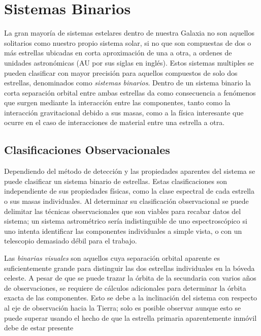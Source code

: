 \section{Sistemas Binarios}

La gran mayoría de sistemas estelares dentro de nuestra Galaxia no son aquellos
solitarios como nuestro propio sistema solar, si no que son compuestas de dos o
más estrellas ubicadas en corta aproximación de una a otra, a ordenes de
unidades astronómicas (AU por sus siglas en inglés). Estos sistemas multiples se
pueden clasificar con mayor precisión para aquellos compuestos de solo dos
estrellas, denominados como \textit{sistemas binarios}. Dentro de un sistema
binario la corta separación orbital entre ambas estrellas da como consecuencia a
fenómenos que surgen mediante la interacción entre las componentes, tanto como
la interacción gravitacional debido a sus masas, como a la física interesante
que ocurre en el caso de interacciones de material entre una estrella a otra. 

\subsection{Clasificaciones Observacionales}

Dependiendo del método de detección y las propiedades aparentes del sistema se
puede clasificar un sistema binario de estrellas. Estas clasificaciones son
independiente de sus propiedades físicas, como la clase espectral de cada
estrella o sus masas individuales. Al determinar su clasificación observacional
se puede delimitar las técnicas observacionales que son viables para recabar
datos del sistema; un sistema astrométrico sería indistinguible de uno
espectroscópico si uno intenta identificar las componentes individuales a simple
vista, o con un telescopio demasiado débil para el trabajo.

Las \textit{binarias visuales} son aquellos cuya separación orbital aparente es
suficientemente grande para distinguir las dos estrellas individuales en la
bóveda celeste. A pesar de que se puede trazar la órbita de la secundaria con
varios años de observaciones, se requiere de cálculos adicionales para
determinar la órbita exacta de las componentes. Esto se debe a la inclinación
del sistema con respecto al eje de observación hacia la Tierra; solo es posible
observar  aunque esto se puede superar usando el hecho de que la estrella primaria
aparentemente inmóvil debe de estar presente  \citet{fundamentalAstronomy::chapter10_binaryStars}

